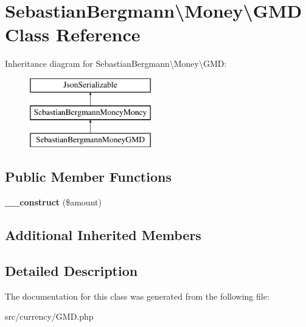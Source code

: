 \hypertarget{classSebastianBergmann_1_1Money_1_1GMD}{}\section{Sebastian\+Bergmann\textbackslash{}Money\textbackslash{}G\+M\+D Class Reference}
\label{classSebastianBergmann_1_1Money_1_1GMD}
Inheritance diagram for Sebastian\+Bergmann\textbackslash{}Money\textbackslash{}G\+M\+D\+:\begin{figure}[H]
\begin{center}
\leavevmode
\includegraphics[height=3.000000cm]{classSebastianBergmann_1_1Money_1_1GMD}
\end{center}
\end{figure}
\subsection*{Public Member Functions}
\begin{DoxyCompactItemize}
\item 
\hypertarget{classSebastianBergmann_1_1Money_1_1GMD_a727526272f6d70632907e7733e97e17a}{}{\bfseries \+\_\+\+\_\+construct} (\$amount)\label{classSebastianBergmann_1_1Money_1_1GMD_a727526272f6d70632907e7733e97e17a}

\end{DoxyCompactItemize}
\subsection*{Additional Inherited Members}


\subsection{Detailed Description}


The documentation for this class was generated from the following file\+:\begin{DoxyCompactItemize}
\item 
src/currency/G\+M\+D.\+php\end{DoxyCompactItemize}
